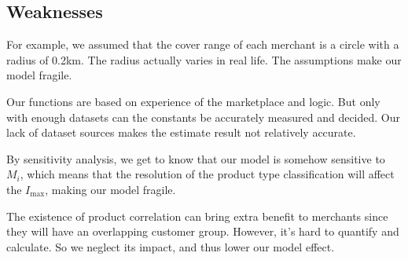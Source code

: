 \subsection{Weaknesses}
\begin{enumerate}

For example, we assumed that the cover range of each merchant is a circle with a radius of 0.2km. The radius actually varies in real life. The assumptions make our model fragile.


Our functions are based on experience of the marketplace and logic. But only with enough datasets can the constants be accurately measured and decided. Our lack of dataset sources makes the estimate result not relatively accurate.


By sensitivity analysis, we get to know that our model is somehow sensitive to $M_i$, which means that the resolution of the product type classification will affect the $I_{\max}$, making our model fragile.


The existence of product correlation can bring extra benefit to merchants since they will have an overlapping customer group. However, it's hard to quantify and calculate. So we neglect its impact, and thus lower our model effect.
\end{enumerate}